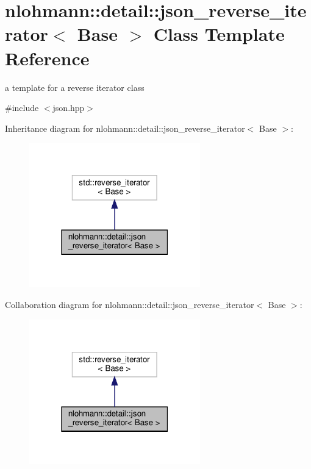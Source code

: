 \hypertarget{classnlohmann_1_1detail_1_1json__reverse__iterator}{}\section{nlohmann\+:\+:detail\+:\+:json\+\_\+reverse\+\_\+iterator$<$ Base $>$ Class Template Reference}
\label{classnlohmann_1_1detail_1_1json__reverse__iterator}


a template for a reverse iterator class  




{\ttfamily \#include $<$json.\+hpp$>$}



Inheritance diagram for nlohmann\+:\+:detail\+:\+:json\+\_\+reverse\+\_\+iterator$<$ Base $>$\+:\nopagebreak
\begin{figure}[H]
\begin{center}
\leavevmode
\includegraphics[width=210pt]{classnlohmann_1_1detail_1_1json__reverse__iterator__inherit__graph}
\end{center}
\end{figure}


Collaboration diagram for nlohmann\+:\+:detail\+:\+:json\+\_\+reverse\+\_\+iterator$<$ Base $>$\+:\nopagebreak
\begin{figure}[H]
\begin{center}
\leavevmode
\includegraphics[width=210pt]{classnlohmann_1_1detail_1_1json__reverse__iterator__coll__graph}
\end{center}
\end{figure}
